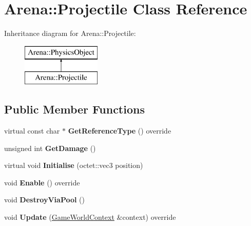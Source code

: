 \hypertarget{class_arena_1_1_projectile}{\section{Arena\+:\+:Projectile Class Reference}
\label{class_arena_1_1_projectile}
}
Inheritance diagram for Arena\+:\+:Projectile\+:\begin{figure}[H]
\begin{center}
\leavevmode
\includegraphics[height=2.000000cm]{class_arena_1_1_projectile}
\end{center}
\end{figure}
\subsection*{Public Member Functions}
\begin{DoxyCompactItemize}
\item 
\hypertarget{class_arena_1_1_projectile_a3fae6cd923c73c5244a0ba07d3fe7896}{virtual const char $\ast$ {\bfseries Get\+Reference\+Type} () override}\label{class_arena_1_1_projectile_a3fae6cd923c73c5244a0ba07d3fe7896}

\item 
\hypertarget{class_arena_1_1_projectile_a68c2602cb7f22b6cd42fd3320441ff46}{unsigned int {\bfseries Get\+Damage} ()}\label{class_arena_1_1_projectile_a68c2602cb7f22b6cd42fd3320441ff46}

\item 
\hypertarget{class_arena_1_1_projectile_a011321d476f72525f6bc52fd9baecd19}{virtual void {\bfseries Initialise} (octet\+::vec3 position)}\label{class_arena_1_1_projectile_a011321d476f72525f6bc52fd9baecd19}

\item 
\hypertarget{class_arena_1_1_projectile_a76a406a08c246337356b38e4cd9e101f}{void {\bfseries Enable} () override}\label{class_arena_1_1_projectile_a76a406a08c246337356b38e4cd9e101f}

\item 
\hypertarget{class_arena_1_1_projectile_a7a87a9b2c4dfaa78bc8d610f1721f5dd}{void {\bfseries Destroy\+Via\+Pool} ()}\label{class_arena_1_1_projectile_a7a87a9b2c4dfaa78bc8d610f1721f5dd}

\item 
\hypertarget{class_arena_1_1_projectile_a2d7248cf20fce133ba6e44622e066a9c}{void {\bfseries Update} (\hyperlink{struct_arena_1_1_game_world_context}{Game\+World\+Context} \&context) override}\label{class_arena_1_1_projectile_a2d7248cf20fce133ba6e44622e066a9c}

\end{DoxyCompactItemize}
